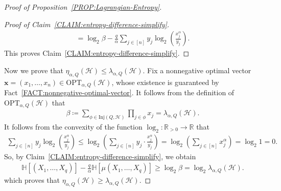 \documentclass[10pt,a4paper]{amsart}
\begin{document}
\begin{proof}[Proof of Proposition~\ref{PROP:Lagrangian-Entropy}]
\begin{proof}[Proof of Claim~\ref{CLAIM:entropy-difference-simplify}]
\begin{align*}
            = \log_{2} \beta - \frac{q}{\alpha} \sum_{j \in [n]} y_j \log_{2}\left(\frac{x_j^{\alpha}}{y_j}\right). 
        \end{align*}
        This proves Claim~\ref{CLAIM:entropy-difference-simplify}. 
    \end{proof}%

    Now we prove that $\eta_{\alpha, Q}(\mathcal{H}) \le \lambda_{\alpha, Q}(\mathcal{H})$. 
    Fix a nonnegative optimal vector $\mathbf{x} = (x_1, \ldots, x_n) \in \mathrm{OPT}_{\alpha,Q}(\mathcal{H})$, whose existence is guaranteed by Fact~\ref{FACT:nonnegative-optimal-vector}. 
    It follows from the definition of $\mathrm{OPT}_{\alpha,Q}(\mathcal{H})$ that 
    \begin{align*}
        \beta
        \coloneqq \sum_{\phi \in \mathrm{Inj}(Q,\mathcal{H})} \prod_{j \in \phi} x_j
        = \lambda_{\alpha,Q}(\mathcal{H}). 
    \end{align*}
    It follows from the convexity of the function $\log_{2} \colon \mathbb{R}_{>0} \to \mathbb{R}$ that 
    \begin{align*}
        \sum_{j \in [n]} y_j \log_{2}\left(\frac{x_j^{\alpha}}{y_j}\right) 
        \le \log_{2}\left(\sum_{j \in [n]} y_j \cdot \frac{x_j^{\alpha}}{y_j}\right)
        = \log_{2} \left(\sum_{j \in [n]} x_j^{\alpha}\right)
        = \log_{2} 1
        = 0. 
    \end{align*}
    So, by Claim~\ref{CLAIM:entropy-difference-simplify}, we obtain 
    \begin{align*}
        \mathbb{H}\left[ (X_1, \ldots, X_{q}) \right] - \frac{q}{\alpha}  \mathbb{H}[\mu(X_{1}, \ldots, X_q)]
        \ge \log_{2}\beta
        = \log_{2} \lambda_{\alpha,Q}(\mathcal{H}). 
    \end{align*}
    which proves that $\eta_{\alpha, Q}(\mathcal{H}) \ge \lambda_{\alpha, Q}(\mathcal{H})$. 


\end{proof}
\end{document}
